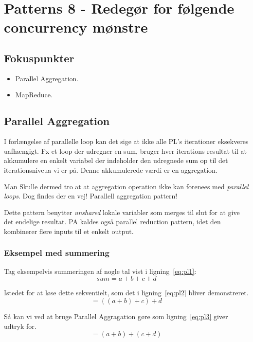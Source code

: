 \section{Patterns 8 - Redegør for følgende concurrency mønstre}

\subsection{Fokuspunkter}

\begin{itemize}
	\item Parallel Aggregation.
	\item MapReduce.
\end{itemize}

\subsection{Parallel Aggregation}
I forlængelse af parallelle loop kan det sige at ikke alle PL's iterationer eksekveres uafhængigt. Fx et loop der udregner en sum, bruger hver iterations resultat til at akkumulere en enkelt variabel der indeholder den udregnede sum op til det iterationsniveua vi er på. Denne akkumulerede værdi er en aggregation.

Man Skulle dermed tro at at aggregation operation ikke kan forenees med \textit{parallel loops}. Dog findes der en vej! Parallell aggregation pattern!

Dette pattern benytter \textit{unshared} lokale variabler som merges til slut for at give det endelige resultat. PA kaldes også parallel reduction pattern, idet den kombinerer flere inputs til et enkelt output.\\

\subsubsection{Eksempel med summering}
Tag eksempelvis summeringen af nogle tal vist i ligning~\ref{eq:pl1}:
\begin{equation}\label{eq:pl1}
sum = a + b + c + d
\end{equation}

Istedet for at løse dette sekventielt, som det i ligning~\ref{eq:pl2} bliver demonstreret. 
\begin{equation}\label{eq:pl2}
=((a + b) + c) + d
\end{equation}

Så kan vi ved at bruge Parallel Aggragation gøre som ligning~\ref{eq:pl3} giver udtryk for.
\begin{equation}\label{eq:pl3}
=(a + b) + (c + d)
\end{equation}

